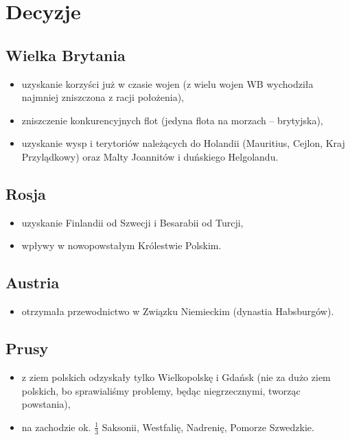 \documentclass [a4paper, 11pt, oneside]{book}
\begin{document}
    \section{Decyzje} %
    \label{sec:decyzje}
        \subsection{Wielka Brytania} %
        \label{sub:wielka_brytania}
            \begin{itemize}
                \item uzyskanie korzyści już w czasie wojen (z wielu wojen WB wychodziła najmniej zniszczona z racji położenia),
                \item zniszczenie konkurencyjnych flot (jedyna flota na morzach -- brytyjska),
                \item uzyskanie wysp i terytoriów należących do Holandii (Mauritius, Cejlon, Kraj Przylądkowy) oraz Malty Joannitów i duńskiego Helgolandu.
            \end{itemize}
        \subsection{Rosja} %
        \label{sub:rosja}
            \begin{itemize}
                \item uzyskanie Finlandii od Szwecji i Besarabii od Turcji,
                \item wpływy w nowopowstałym Królestwie Polskim.
            \end{itemize}
        \subsection{Austria} %
        \label{sub:austria}
            \begin{itemize}
                \item otrzymała przewodnictwo w Związku Niemieckim (dynastia Habsburgów).
            \end{itemize}
        \subsection{Prusy} %
        \label{sub:prusy}
            \begin{itemize}
                \item z ziem polskich odzyskały tylko Wielkopolskę i Gdańsk (nie za dużo ziem polskich, bo sprawialiśmy problemy, będąc niegrzecznymi, tworząc powstania),
                \item na zachodzie ok. $\frac13$ Saksonii, Westfalię, Nadrenię, Pomorze Szwedzkie.
            \end{itemize}
\end{document}

